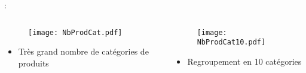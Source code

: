 \documentclass[8pt,aspectratio=169,hyperref={unicode=true}]{beamer}
\begin{document}
\begin{frame}{\insertsection: \insertsubsection}
    \begin{columns}[t]
        \begin{column}{.6\textwidth}
            \begin{figure}
                \texttt{[image: NbProdCat.pdf]}
            \end{figure}
            \begin{itemize}
                \item Très grand nombre de catégories de produits
            \end{itemize}
        \end{column}
        \begin{column}{.4\textwidth}
            \begin{figure}
                \texttt{[image: NbProdCat10.pdf]}
            \end{figure}
            \begin{itemize}
                \item Regroupement en 10 catégories
            \end{itemize}
        \end{column}
    \end{columns}
\end{frame}
\end{document}
